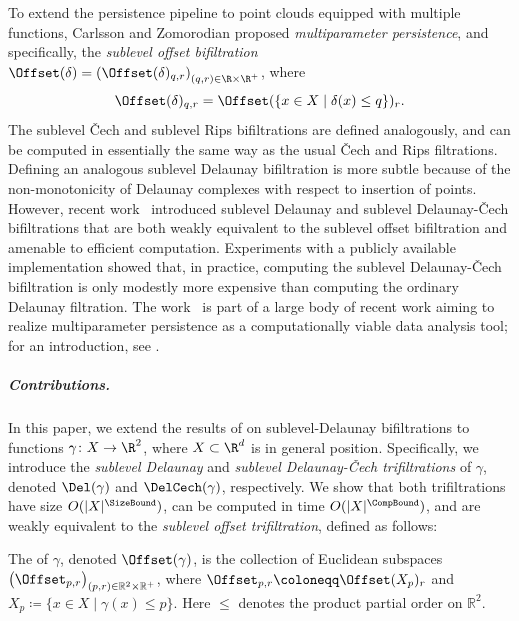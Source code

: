 To extend the persistence pipeline to point clouds equipped with multiple functions, Carlsson and Zomorodian \cite{carlsson2009theory} proposed \emph{multiparameter persistence}, and specifically, the \emph{sublevel offset bifiltration} $\Offset(\delta) = \left( \Offset(\delta)_{q,r} \right)_{(q,r)\in \R\times \R^{+}}$, where \[\Offset(\delta)_{q,r}=\Offset(\{x\in X\mid \delta(x)\leq q\})_{r}.\]
The sublevel {\v C}ech and sublevel Rips bifiltrations are defined analogously, and can be computed in essentially the same way as the usual \v Cech and Rips filtrations.  
%
Defining an analogous sublevel Delaunay bifiltration is more subtle because of the non-monotonicity of Delaunay complexes with respect to insertion of points.  
However, recent work~\cite{alonsoDelaunayBifiltrationsFunctions2024} introduced sublevel Delaunay and sublevel Delaunay-\v Cech bifiltrations that are both weakly equivalent to the sublevel offset bifiltration and amenable to efficient computation.  Experiments with a publicly available implementation showed that, in practice, computing the sublevel Delaunay-\v Cech bifiltration is only modestly more expensive than computing the ordinary Delaunay filtration.  The work~\cite{alonsoDelaunayBifiltrationsFunctions2024} is part of a large body of recent work aiming to realize multiparameter persistence as a computationally viable data analysis tool; for an introduction, see \cite{botnan2023introduction}.  
%
\subparagraph{Contributions.}
In this paper, we extend the results of \cite{alonsoDelaunayBifiltrationsFunctions2024} on sublevel-Delaunay bifiltrations to functions $\gamma\colon X \to \R^2$, where $X\subset \R^d$ is in general position. Specifically, we introduce the \emph{sublevel Delaunay} and \emph{sublevel Delaunay-\v{C}ech trifiltrations} of $\gamma$, denoted $\Del(\gamma)$ and $\DelCech(\gamma)$, respectively. We show that both trifiltrations have size $O(|X|^{\SizeBound})$, can be computed in time $O(|X|^\CompBound)$, and are weakly equivalent to the \emph{sublevel offset trifiltration}, defined as follows:
 \begin{definition}
The  of $\gamma$, denoted $\Offset(\gamma)$, is the collection of Euclidean subspaces $\bigl(\Offset_{p,r}\bigr)_{(p,r)\in \mathbb{R}^2 \times \mathbb{R}^{+}}$,
where
$\Offset_{p,r} \coloneqq \Offset(X_p)_r$ and 
$X_p \coloneqq \{x \in X \mid \gamma(x) \le p\}.$
%
Here $\le$ denotes the product partial order on $\mathbb{R}^2$.\end{definition}
